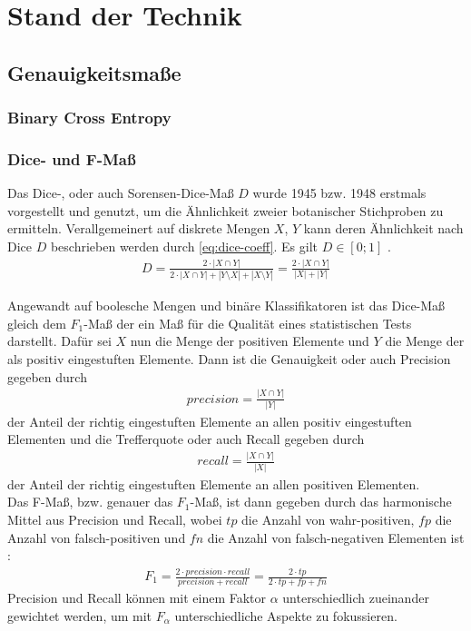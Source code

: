 
\chapter{Stand der Technik}


\section{Genauigkeitsmaße}

\subsection{Binary Cross Entropy}

\subsection{Dice- und F-Maß}

Das Dice-, oder auch Sorensen-Dice-Maß $D$ wurde 1945 bzw. 1948 erstmals vorgestellt und genutzt, um die Ähnlichkeit zweier botanischer Stichproben zu ermitteln. Verallgemeinert auf diskrete Mengen $X$, $Y$ kann deren Ähnlichkeit nach Dice $D$ beschrieben werden durch \autoref{eq:dice-coeff}. Es gilt $D \in [0; 1]$ \cites[S.~33]{Srenson.1948}[S.~297]{Dice.1945}. 
\begin{align}
	\label{eq:dice-coeff} D = \frac{2 \cdot | X \cap Y |}{2 \cdot | X \cap Y | + |Y \setminus X| + |X \setminus Y|} 
	=\frac{2 \cdot | X \cap Y |}{|X| + |Y|}
\end{align} 

Angewandt auf boolesche Mengen und binäre Klassifikatoren ist das Dice-Maß gleich dem $F_1$-Maß der  ein Maß für die Qualität eines statistischen Tests darstellt. Dafür sei $X$ nun die Menge der positiven Elemente und $Y$ die Menge der als positiv eingestuften Elemente. Dann ist die Genauigkeit oder auch Precision gegeben durch
\begin{align}
	\label{eq:precision} precision = \frac{|X \cap Y|}{|Y|}
\end{align}
der Anteil der richtig eingestuften Elemente an allen positiv eingestuften Elementen und die Trefferquote oder auch Recall gegeben durch
\begin{align}
	\label{eq:recall} recall = \frac{|X \cap Y|}{|X|}
\end{align}
der Anteil der richtig eingestuften Elemente an allen positiven Elementen. \\
Das F-Maß, bzw. genauer das $F_1$-Maß, ist dann gegeben durch das harmonische Mittel aus Precision und Recall, wobei $tp$ die Anzahl von wahr-positiven, $fp$ die Anzahl von falsch-positiven und $fn$ die Anzahl von falsch-negativen Elementen ist \cite{YutakaSasaki.2007}:
\begin{align}
	\label{eq:f1} F_{1} = \frac{2\cdot precision \cdot recall}{precision + recall} = \frac{2\cdot tp}{2 \cdot tp + fp + fn}
\end{align}
Precision und Recall können mit einem Faktor $\alpha$ unterschiedlich zueinander gewichtet werden, um mit $F_{\alpha}$ unterschiedliche Aspekte zu fokussieren. 

